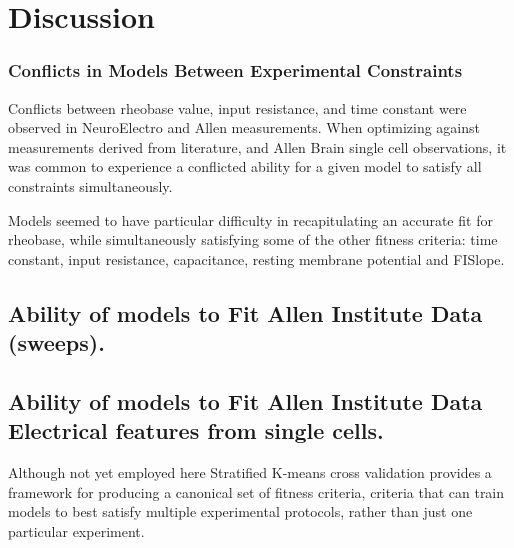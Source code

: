 \section{Discussion}

\subsubsection{Conflicts in Models Between Experimental Constraints}

Conflicts between rheobase value, input resistance, and time constant  were observed in NeuroElectro and Allen measurements. When optimizing against measurements derived from literature, and Allen Brain single cell observations, it was common to experience a conflicted ability for a given model to satisfy all constraints simultaneously. 

Models seemed to have particular difficulty in recapitulating an accurate fit for rheobase, while simultaneously satisfying some of the other fitness criteria: time constant, input resistance, capacitance, resting membrane potential and FISlope. 


\subsection{Ability of models to Fit Allen Institute Data (sweeps).}
\subsection{Ability of models to Fit Allen Institute Data Electrical features from single cells.}

Although not yet employed here Stratified K-means cross validation provides a framework for producing a canonical set of fitness criteria, criteria that can train models to best satisfy multiple experimental protocols, rather than just one particular experiment.

